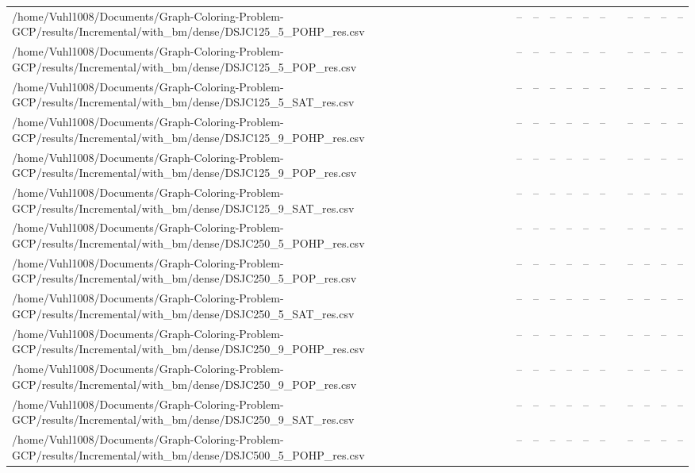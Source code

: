 \begin{table}[htbp]
\begin{tabular}{llllllllllll}
/home/Vuhl1008/Documents/Graph-Coloring-Problem-GCP/results/Incremental/with\_bm/dense/DSJC125\_5\_POHP\_res.csv & -- & -- & -- & -- & -- & -- & {} & -- & -- & -- & -- \\
/home/Vuhl1008/Documents/Graph-Coloring-Problem-GCP/results/Incremental/with\_bm/dense/DSJC125\_5\_POP\_res.csv & -- & -- & -- & -- & -- & -- & {} & -- & -- & -- & -- \\
/home/Vuhl1008/Documents/Graph-Coloring-Problem-GCP/results/Incremental/with\_bm/dense/DSJC125\_5\_SAT\_res.csv & -- & -- & -- & -- & -- & -- & {} & -- & -- & -- & -- \\
/home/Vuhl1008/Documents/Graph-Coloring-Problem-GCP/results/Incremental/with\_bm/dense/DSJC125\_9\_POHP\_res.csv & -- & -- & -- & -- & -- & -- & {} & -- & -- & -- & -- \\
/home/Vuhl1008/Documents/Graph-Coloring-Problem-GCP/results/Incremental/with\_bm/dense/DSJC125\_9\_POP\_res.csv & -- & -- & -- & -- & -- & -- & {} & -- & -- & -- & -- \\
/home/Vuhl1008/Documents/Graph-Coloring-Problem-GCP/results/Incremental/with\_bm/dense/DSJC125\_9\_SAT\_res.csv & -- & -- & -- & -- & -- & -- & {} & -- & -- & -- & -- \\
/home/Vuhl1008/Documents/Graph-Coloring-Problem-GCP/results/Incremental/with\_bm/dense/DSJC250\_5\_POHP\_res.csv & -- & -- & -- & -- & -- & -- & {} & -- & -- & -- & -- \\
/home/Vuhl1008/Documents/Graph-Coloring-Problem-GCP/results/Incremental/with\_bm/dense/DSJC250\_5\_POP\_res.csv & -- & -- & -- & -- & -- & -- & {} & -- & -- & -- & -- \\
/home/Vuhl1008/Documents/Graph-Coloring-Problem-GCP/results/Incremental/with\_bm/dense/DSJC250\_5\_SAT\_res.csv & -- & -- & -- & -- & -- & -- & {} & -- & -- & -- & -- \\
/home/Vuhl1008/Documents/Graph-Coloring-Problem-GCP/results/Incremental/with\_bm/dense/DSJC250\_9\_POHP\_res.csv & -- & -- & -- & -- & -- & -- & {} & -- & -- & -- & -- \\
/home/Vuhl1008/Documents/Graph-Coloring-Problem-GCP/results/Incremental/with\_bm/dense/DSJC250\_9\_POP\_res.csv & -- & -- & -- & -- & -- & -- & {} & -- & -- & -- & -- \\
/home/Vuhl1008/Documents/Graph-Coloring-Problem-GCP/results/Incremental/with\_bm/dense/DSJC250\_9\_SAT\_res.csv & -- & -- & -- & -- & -- & -- & {} & -- & -- & -- & -- \\
/home/Vuhl1008/Documents/Graph-Coloring-Problem-GCP/results/Incremental/with\_bm/dense/DSJC500\_5\_POHP\_res.csv & -- & -- & -- & -- & -- & -- & {} & -- & -- & -- & -- \\

\end{tabular}
\end{table}
